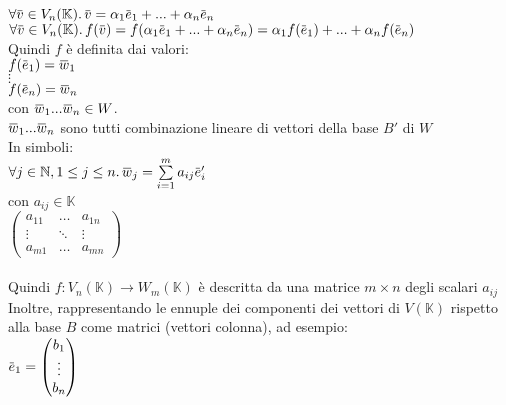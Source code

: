 \documentclass[a4paper, twoside, italian, 11pt]{book}
\newcommand{\overbar}[1] {\mkern 1.5mu\overline{\mkern-1.5mu#1\mkern-1.5mu}\mkern 1.5mu}
\newcommand{\N}{\mathbb N}
\newcommand{\K}{\mathbb K}
\begin{document}
$\forall \overbar v \in V_n(\K) \ldotp \overbar v = \alpha_1 \overbar e_1 + ... + \alpha_n \overbar e_n$ \\

$\forall \overbar v \in V_n(\K) \ldotp f(\overbar v) = f(\alpha_1 \overbar e_1 + ... + \alpha_n \overbar e_n) = \alpha_1 f(\overbar e_1) + ... + \alpha_n f(\overbar e_n)$ \\

\noindent
Quindi $f$ è definita dai valori: \\

$f(\overbar e_1) = \overbar w_1$ \\
\indent
$\vdots$ \\
\indent
$f(\overbar e_n) = \overbar w_n$ \\

\noindent
con $\overbar w_1 ... \overbar w_n \in W$. \\

\noindent
$\overbar w_1 ... \overbar w_n$ sono tutti combinazione lineare di vettori della base $B'$ di $W$ \\

\noindent
In simboli: \\

$\forall j \in \N, 1 \leq j \leq n \ldotp \overbar w_j = \sum\limits_{i = 1}^{m} a_{ij} \overbar e'_i$ \\

\noindent
con $a_{ij} \in \K$ \\

\noindent
$\begin{pmatrix}
a_{11} & \dots & a_{1n} \\
\vdots & \ddots & \vdots \\
a_{m1} & \dots & a_{mn}
\end{pmatrix}$ \\\\

\noindent
Quindi $f : V_n(\K) \rightarrow W_m(\K)$ è descritta da una matrice $m \times n$ degli scalari $a_{ij}$ \\

\noindent
Inoltre, rappresentando le ennuple dei componenti dei vettori di $V(\K)$ rispetto alla base $B$ come matrici (vettori colonna), ad esempio: \\

$\overbar e_1 =
\begin{pmatrix}
b_1 \\
\vdots \\
b_n
\end{pmatrix}$ \\\\
\end{document}
